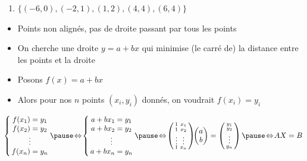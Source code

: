 \begin{frame}
  
\begin{enumerate}
  \item $\big\{(-6,0), (-2,1), (1,2), (4,4), (6,4)\big\}$
 \end{enumerate} 
 
\vspace*{-0.5ex}

\pause 
\begin{itemize}
  \item Points non alignés, pas de droite passant par tous les points
  \pause
  \item On cherche une droite $y = a +bx$ qui minimise (le carré de) la distance  
  entre les points et la droite
  \pause
  \item Posons $f(x) = a + bx$
  \pause
  \item Alors pour nos $n$ points $(x_i,y_i)$ donnés, on voudrait $f(x_i)=y_i$
\end{itemize}

\pause
  $
  \left\{ \!\!
  \begin{array}{c}
  f(x_1) = y_1 \\
  f(x_2) = y_2 \\
  \vdots  \\
  f(x_n) = y_n \\
  \end{array}
  \right.\!\!\!
  \pause\!\Leftrightarrow \!
  \left\{ \!\!
  \begin{array}{c}
  a +b x_1 = y_1 \\
  a +b x_2 = y_2 \\
  \vdots \\
  a +b x_n = y_n \\
  \end{array}
  \right.\!\!\!
  \pause\!\Leftrightarrow \!
  \left(\begin{smallmatrix}
  1 & x_1 \\
  1 & x_2 \\
  \vdots & \vdots \\
  1 & x_n \\  
  \end{smallmatrix}\right)\!\!
  \begin{pmatrix}
  a \\ b  
  \end{pmatrix}
  = 
  \left(\begin{smallmatrix}
  y_1\\
  y_2 \\
  \vdots \\
  y_n
  \end{smallmatrix}\right)
  \pause\!\Leftrightarrow\!
  AX = B
  $
  

\end{frame}
